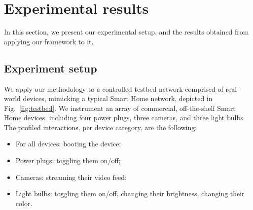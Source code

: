 \section{Experimental results}
\label{sec:results}

In this section, we present our experimental setup,
and the results obtained from applying our framework to it.



\subsection{Experiment setup}

We apply our methodology to a controlled testbed network comprised of real-world devices,
mimicking a typical Smart Home network, depicted in Fig.~\ref{fig:testbed}.
We instrument an array of commercial, off-the-shelf Smart Home devices,
including four power plugs, three cameras, and three light bulbs.
The profiled interactions, per device category, are the following:
\begin{itemize}
  \item For all devices: booting the device;
  \item Power plugs: toggling them on/off;
  \item Cameras: streaming their video feed;
  \item Light bulbs: toggling them on/off, changing their brightness, changing their color.
\end{itemize}




